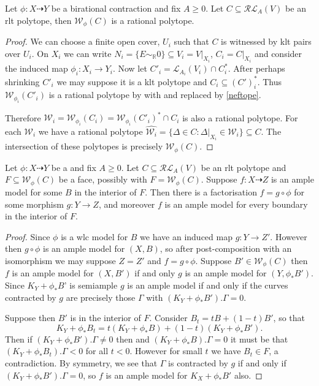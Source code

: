 	\begin{lemma}\label{rationality}
		Let $\phi: X \dashrightarrow Y$ be a birational contraction and fix $A \geq 0$. Let $C \subseteq \mathcal{RL}_{A}(V)$ be an rlt polytope, then $\mathcal{W}_{\phi}(C)$ is a rational polytope.
	\end{lemma}
	\begin{proof}
		We can choose a finite open cover, $U_{i}$ such that $C$ is witnessed by klt pairs over $U_{i}$. On $X_{i}$ we can write $N_{i}=\{E\sim_{\mathbb{R}} 0\} \subseteq V_{i}=V|_{X_{i}}$, $C_{i}=C|_{X_{i}}$ and consider the induced map $\phi_{i}:X_{i} \to Y_{i}$. Now let $C'_{i}=\mathcal{L}_{A_{i}}(V_{i}) \cap C_{i}^{*}$. After perhaps shrinking $C'_{i}$ we may suppose it is a klt polytope and $C_{i} \subseteq (C')^{*}_{i}$. Thus $\mathcal{W}_{\phi_{i}}(C'_{i})$ is a rational polytope by \cite[Corollary 3.11.2]{BCHM10} with \cite[Theorem 3.11.1]{BCHM10} and \cite[Lemma 3.7.4]{BCHM10} replaced by \autoref{neftope}.
		
		Therefore $\mathcal{W}_{i}=\mathcal{W}_{\phi_{i}}(C_{i})=\mathcal{W}_{\phi_{i}}(C'_{i})^{*}\cap C_{i}$ is also a rational polytope. For each $\mathcal{W}_{i}$ we have a rational polytope $\hat{\mathcal{W}_{i}}=\{\Delta \in C: \Delta|_{X_{i}} \in \mathcal{W}_{i}\} \subseteq C$. The intersection of these polytopes is precisely $\mathcal{W}_{\phi}(C)$.
	\end{proof}
	
	\begin{lemma}\label{faces}
		Let $\phi: X \dashrightarrow Y$ be a and fix $A \geq 0$. Let $C \subseteq \mathcal{RL}_{A}(V)$ be an rlt polytope and $F \subseteq \mathcal{W}_{\phi}(C)$ be a face, possibly with $F =\mathcal{W}_{\phi}(C)$. Suppose $f: X \dashrightarrow Z$ is an ample model for some $B$ in the interior of $F$. Then there is a factorisation $f=g \circ \phi$ for some morphism $g:Y \to Z$, and moreover $f$ is an ample model for every boundary in the interior of $F$.
	\end{lemma}
	
	\begin{proof}
		Since $\phi$ is a wlc model for $B$ we have an induced map $g: Y \to Z'$. However then $g\circ \phi$ is an ample model for $(X,B)$, so after post-composition with an isomorphism we may suppose $Z=Z'$ and $f=g\circ \phi$. Suppose $B' \in \mathcal{W}_{\phi}(C)$ then $f$ is an ample model for $(X,B')$ if and only $g$ is an ample model for $(Y,\phi_{*}B')$. Since $K_{Y}+\phi_{*}B$' is semiample $g$ is an ample model if and only if the curves contracted by $g$ are precisely those $\Gamma$ with $(K_{Y}+\phi_{*}B').\Gamma=0$.
		
		Suppose then $B'$ is in the interior of $F$. Consider $B_{t}=tB+(1-t)B'$, so that $$K_{Y}+\phi_{*}B_{t}= t(K_{Y}+\phi_{*}B)+(1-t)(K_{Y}+\phi_{*}B').$$ Then if $(K_{Y}+\phi_{*}B').\Gamma \neq 0$ then and $(K_{Y}+\phi_{*}B).\Gamma=0$ it must be that $(K_{Y}+\phi_{*}B_{t}).\Gamma < 0$ for all $t < 0$. However for small $t$ we have $B_{t} \in F$, a contradiction. By symmetry, we see that $\Gamma$ is contracted by $g$ if and only if $(K_{Y}+\phi_{*}B').\Gamma=0$, so $f$ is an ample model for $K_{X}+\phi_{*}B'$ also.
	\end{proof} 


